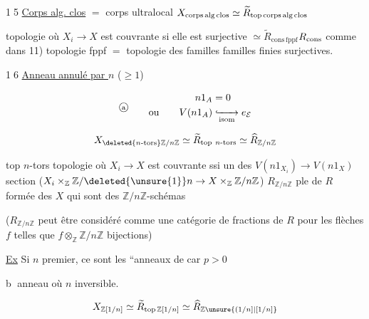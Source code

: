 
\textcircled{\scriptsize 15} \uline{Corps alg. clos} $=$ corps ultralocal \quad
$X_{\rm corps\,alg\,clos}\simeq\widetilde R_{\rm top\,corps\,alg\,clos}$

topologie où $X_i\to X$ est couvrante si elle est surjective
$\simeq\widetilde R_{\mathrm{cons\,fppf}}$\quad $R_{\rm cons}$ comme dans 11)
topologie fppf $=$ topologie des familles  familles  finies surjectives.

\textcircled{\scriptsize 16} \uline{Anneau  annulé par $n$} ($\geq1$)

\[
 \text{\textcircled{\scriptsize a}}\qquad
 \begin{aligned}n1_A&=0\\ \text{ou}\qquad V(n1_A)&\lhook\joinrel\xrightarrow[\rm isom]{} e_{\mathcal E}\end{aligned}
\]

\[
 X_{\deleted{n\text{-tors}}\mathbb Z/n\mathbb Z}\simeq\widetilde R_{\mathrm{top}\ n\text{-tors}}
 \simeq \widehat R_{\mathbb Z/n\mathbb Z}
\]


top $n$-tors topologie où $X_i\to X$ est couvrante ssi un des $V(n1_{X_i})\to V(n1_X)$   section
($X_i\times_{\mathbb Z}\mathbb Z/\deleted{\unsure{1}}n\to X\times_{\mathbb Z}\mathbb Z/n\mathbb Z$)
$R_{\mathbb Z/n\mathbb Z}$  ple de $R$ formée des  $X$ qui sont des $\mathbb Z/n\mathbb Z$-schémas

($R_{\mathbb Z/n\mathbb Z}$ peut être considéré comme une catégorie de fractions de $R$ pour les flèches $f$ telles que $f\otimes_{\mathbb Z}\mathbb Z/n\mathbb Z$ bijections)

 \uline{Ex} Si $n$ premier, ce sont les ``anneaux de car $p>0$

 \textcircled{\scriptsize b} anneau où $n$ inversible.

\[
 X_{\mathbb Z[1/n]}\simeq\widetilde R_{\mathrm{top}\,\mathbb Z[1/n]}
 \simeq\widehat R_{\mathbb Z\unsure{(1/n]|[1/n]}}
\]


